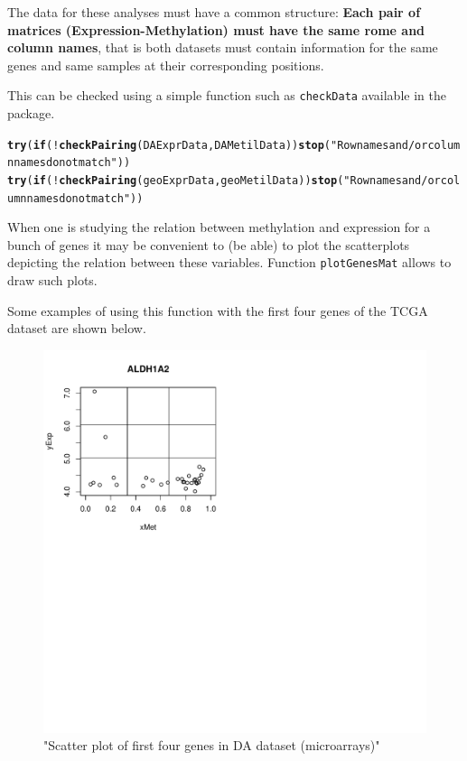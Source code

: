 \documentclass[a4paper,10pt]{article}\usepackage[]{graphicx}\usepackage[]{xcolor}
\makeatletter
\def\maxwidth{ %
  \ifdim\Gin@nat@width>\linewidth
    \linewidth
  \else
    \Gin@nat@width
  \fi
}
\newcommand{\hlstr}[1]{\textcolor[rgb]{0.192,0.494,0.8}{#1}}%
\newcommand{\hlopt}[1]{\textcolor[rgb]{0,0,0}{#1}}%
\newcommand{\hlstd}[1]{\textcolor[rgb]{0.345,0.345,0.345}{#1}}%
\newcommand{\hlkwa}[1]{\textcolor[rgb]{0.161,0.373,0.58}{\textbf{#1}}}%
\newcommand{\hlkwd}[1]{\textcolor[rgb]{0.737,0.353,0.396}{\textbf{#1}}}%
\newenvironment{kframe}{%
 \def\at@end@of@kframe{}%
 \ifinner\ifhmode%
  \def\at@end@of@kframe{\end{minipage}}%
  \begin{minipage}{\columnwidth}%
 \fi\fi%
 \def\FrameCommand##1{\hskip\@totalleftmargin \hskip-\fboxsep
 \colorbox{shadecolor}{##1}\hskip-\fboxsep
     \hskip-\linewidth \hskip-\@totalleftmargin \hskip\columnwidth}%
 \MakeFramed {\advance\hsize-\width
   \@totalleftmargin\z@ \linewidth\hsize
   \@setminipage}}%
 {\par\unskip\endMakeFramed%
 \at@end@of@kframe}
\newenvironment{knitrout}{}{} %
\makeatother
\begin{document}
The data for these analyses must have a common structure: \textbf{Each pair of matrices (Expression-Methylation) must have the same rome and column names}, that is both datasets must contain information for the same genes and same samples at their corresponding positions.

This can be checked using a simple function such as \texttt{checkData} available in the package.
\begin{knitrout}
\color{fgcolor}\begin{kframe}
\begin{alltt}
\hlkwd{try}\hlstd{(}\hlkwa{if}\hlstd{(}\hlopt{!}\hlkwd{checkPairing}\hlstd{(DAExprData, DAMetilData))} \hlkwd{stop}\hlstd{(}\hlstr{"Row names and/or column names do not match"}\hlstd{))}
\hlkwd{try}\hlstd{(}\hlkwa{if}\hlstd{(}\hlopt{!}\hlkwd{checkPairing}\hlstd{(geoExprData, geoMetilData))} \hlkwd{stop}\hlstd{(}\hlstr{"Row names and/or column names do not match"}\hlstd{))}
\end{alltt}
\end{kframe}
\end{knitrout}

When one is studying the relation between methylation and expression for a bunch of genes it may be convenient to (be able) to plot the scatterplots depicting the relation between these variables. Function \texttt{plotGenesMat} allows to draw such plots.

Some examples of using this function with the first four genes of the TCGA dataset are shown below. 

\begin{figure}
\begin{knitrout}
\color{fgcolor}
\includegraphics[width=\maxwidth]{figure/plot4Genes1-1} 
\end{knitrout}
\caption{"Scatter plot of first four genes in DA dataset (microarrays)"\label{plot4Genes1}}
\end{figure}
\end{document}
